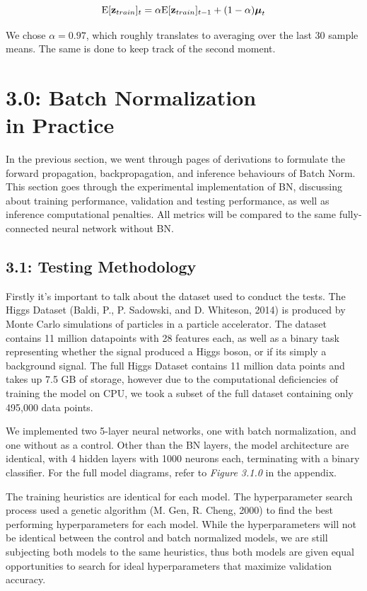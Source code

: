 \documentclass{article}
\begin{document}
\begin{multicols}{2}
\begin{equation}
    \text{E}[\textbf{z}_{train}]_{t} = \alpha \text{E}[\textbf{z}_{train}]_{t-1} + (1-\alpha)\boldsymbol{\mu}_t\notag
\end{equation}

We chose $\alpha = 0.97$, which roughly translates to averaging over the 
last 30 sample means. The same is done to keep track of the second moment.

\section*{3.0: Batch Normalization \\in Practice}

In the previous section, we went through pages of derivations to formulate the 
forward propagation, backpropagation, and inference behaviours of Batch Norm.
This section goes through the experimental implementation of BN, discussing
about training performance, validation and testing performance, as well as
inference computational penalties. All metrics will be compared to the same 
fully-connected neural network without BN.

\subsection*{3.1: Testing Methodology}

Firstly it's important to talk about the dataset used to conduct the tests.
The Higgs Dataset (Baldi, P., P. Sadowski, and D. Whiteson, 2014) is produced 
by Monte Carlo simulations of particles in a particle accelerator. The 
dataset contains 11 million datapoints with 28 features each, as well
as a binary task representing whether the signal produced a Higgs boson, or 
if its simply a background signal. The full Higgs Dataset contains 11 million 
data points and takes up 7.5 GB of storage, however due to the computational 
deficiencies of training the model on CPU, we took a subset of the full dataset
containing only 495,000 data points.

We implemented two 5-layer neural networks, one with batch normalization, and 
one without as a control. Other than the BN layers, the model architecture are
identical, with 4 hidden layers with 1000 neurons each, terminating with a 
binary classifier. For the full model diagrams, refer to \textit{Figure 3.1.0} 
in the appendix.

The training heuristics are identical for each model. The hyperparameter search process used 
a genetic algorithm (M. Gen, R. Cheng, 2000) to find the best performing 
hyperparameters for each model. While the hyperparameters will not be identical
between the control and batch normalized models, we are still subjecting both
models to the same heuristics, thus both models are given equal opportunities 
to search for ideal hyperparameters that maximize validation accuracy.


\end{multicols}
\end{document}
